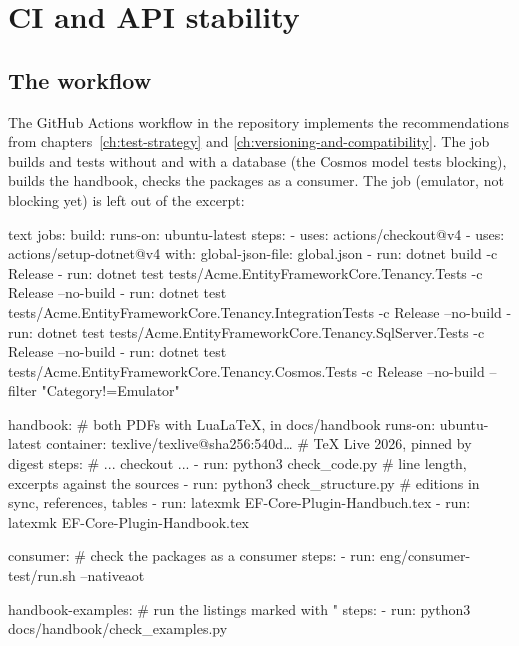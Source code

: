 \chapter{CI and API stability}\label{ch:ci-and-api-stability}

\section{The workflow}

The GitHub Actions workflow in the repository implements the recommendations from
chapters~\ref{ch:test-strategy} and \ref{ch:versioning-and-compatibility}. The job
 builds and tests without and with a database (the Cosmos model tests blocking),  builds the
handbook,  checks the packages as a consumer. The job  (emulator,
not blocking yet) is left out of the excerpt:

\begin{sourcecode}{text}
jobs:
  build:
    runs-on: ubuntu-latest
    steps:
      - uses: actions/checkout@v4
      - uses: actions/setup-dotnet@v4
        with: { global-json-file: global.json }
      - run: dotnet build -c Release
      - run: dotnet test tests/Acme.EntityFrameworkCore.Tenancy.Tests -c Release --no-build
      - run: dotnet test tests/Acme.EntityFrameworkCore.Tenancy.IntegrationTests
          -c Release --no-build
      - run: dotnet test tests/Acme.EntityFrameworkCore.Tenancy.SqlServer.Tests
          -c Release --no-build
      - run: dotnet test tests/Acme.EntityFrameworkCore.Tenancy.Cosmos.Tests
          -c Release --no-build --filter "Category!=Emulator"

  handbook:                            # both PDFs with LuaLaTeX, in docs/handbook
    runs-on: ubuntu-latest
    container: texlive/texlive@sha256:540d…   # TeX Live 2026, pinned by digest
    steps:
      # ... checkout ...
      - run: python3 check_code.py       # line length, excerpts against the sources
      - run: python3 check_structure.py  # editions in sync, references, tables
      - run: latexmk EF-Core-Plugin-Handbuch.tex
      - run: latexmk EF-Core-Plugin-Handbook.tex

  consumer:                            # check the packages as a consumer
    steps:
      - run: eng/consumer-test/run.sh --nativeaot

  handbook-examples:                   # run the listings marked with "%
    steps:
      - run: python3 docs/handbook/check_examples.py
\end{sourcecode}

